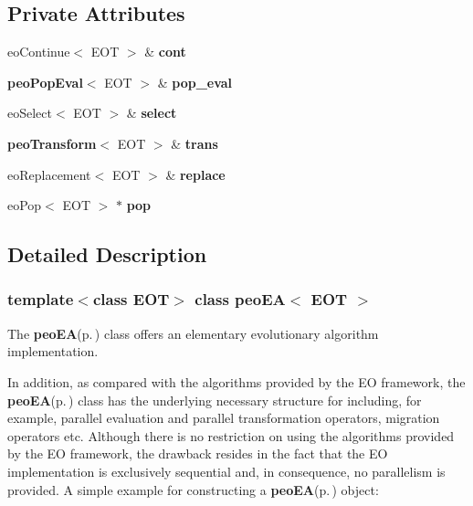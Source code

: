 \subsection*{Private Attributes}
\begin{CompactItemize}
\item 
eo\-Continue$<$ EOT $>$ \& {\bf cont}\label{classpeo_e_a_5f015eebf42f176b9fe322488c446c2a}

\item 
{\bf peo\-Pop\-Eval}$<$ EOT $>$ \& {\bf pop\_\-eval}\label{classpeo_e_a_9140259f50c9186edcb062b023624c96}

\item 
eo\-Select$<$ EOT $>$ \& {\bf select}\label{classpeo_e_a_2d8428d69fdd6aefefbaf543fdd46d19}

\item 
{\bf peo\-Transform}$<$ EOT $>$ \& {\bf trans}\label{classpeo_e_a_713c77935eb8aafebfb9488cfaa4a363}

\item 
eo\-Replacement$<$ EOT $>$ \& {\bf replace}\label{classpeo_e_a_9bd2d4356cf7e69e3141dc269213aa8a}

\item 
eo\-Pop$<$ EOT $>$ $\ast$ {\bf pop}\label{classpeo_e_a_c0b110e410bc16283e8339f24b733772}

\end{CompactItemize}


\subsection{Detailed Description}
\subsubsection*{template$<$class EOT$>$ class peo\-EA$<$ EOT $>$}

The {\bf peo\-EA}{\rm (p.\,\pageref{classpeo_e_a})} class offers an elementary evolutionary algorithm implementation. 

In addition, as compared with the algorithms provided by the EO framework, the {\bf peo\-EA}{\rm (p.\,\pageref{classpeo_e_a})} class has the underlying necessary structure for including, for example, parallel evaluation and parallel transformation operators, migration operators etc. Although there is no restriction on using the algorithms provided by the EO framework, the drawback resides in the fact that the EO implementation is exclusively sequential and, in consequence, no parallelism is provided. A simple example for constructing a {\bf peo\-EA}{\rm (p.\,\pageref{classpeo_e_a})} object:

